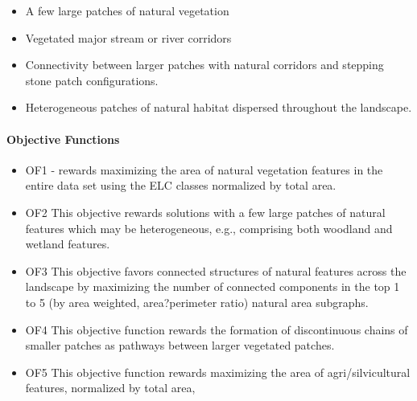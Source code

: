 \documentclass[12pt]{article} %
\begin{document}
\begin{itemize}
  \item A few large patches of natural vegetation
 \item  Vegetated major stream or river corridors
 \item   Connectivity between larger patches with natural corridors and stepping stone patch configurations.
 \item  Heterogeneous patches of natural habitat dispersed throughout the landscape.
\end{itemize}
\paragraph*{Objective Functions}
\begin{itemize}
  \item OF1 - rewards maximizing the area of natural vegetation features in the entire data
set using the ELC classes normalized by total area.
 \item OF2 This objective rewards solutions with a few large patches of natural features which may be heterogeneous, e.g., comprising both woodland and wetland features.
 \item OF3 This objective favors connected structures of natural features across the landscape by maximizing the number of connected components in the top 1 to 5 (by area weighted, area?perimeter ratio) natural area subgraphs.
 \item OF4 This objective function rewards the formation of
discontinuous chains of smaller patches as pathways between larger vegetated
patches.
 \item OF5 This objective function rewards maximizing the area of agri/silvicultural features, normalized by total area,

\end{itemize}
\end{document}
